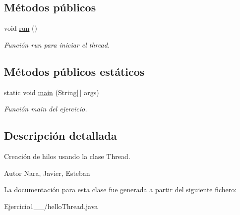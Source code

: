 \subsection*{Métodos públicos}
\begin{DoxyCompactItemize}
\item 
\hypertarget{class_ejercicio1__1__2_1_1hello_thread_a2bc6e380aaedb4372eda52855fa48437}{}void \hyperlink{class_ejercicio1__1__2_1_1hello_thread_a2bc6e380aaedb4372eda52855fa48437}{run} ()\label{class_ejercicio1__1__2_1_1hello_thread_a2bc6e380aaedb4372eda52855fa48437}

\begin{DoxyCompactList}\small\item\em Función run para iniciar el thread. \end{DoxyCompactList}\end{DoxyCompactItemize}
\subsection*{Métodos públicos estáticos}
\begin{DoxyCompactItemize}
\item 
\hypertarget{class_ejercicio1__1__2_1_1hello_thread_acb76a0580e4cf4015b35bd03dd49cea3}{}static void \hyperlink{class_ejercicio1__1__2_1_1hello_thread_acb76a0580e4cf4015b35bd03dd49cea3}{main} (String\mbox{[}$\,$\mbox{]} args)\label{class_ejercicio1__1__2_1_1hello_thread_acb76a0580e4cf4015b35bd03dd49cea3}

\begin{DoxyCompactList}\small\item\em Función main del ejercicio. \end{DoxyCompactList}\end{DoxyCompactItemize}


\subsection{Descripción detallada}
Creación de hilos usando la clase Thread. 

\begin{DoxyAuthor}{Autor}
Nara, Javier, Esteban 
\end{DoxyAuthor}


La documentación para esta clase fue generada a partir del siguiente fichero\+:\begin{DoxyCompactItemize}
\item 
Ejercicio1\+\_\+\_/hello\+Thread.\+java\end{DoxyCompactItemize}
